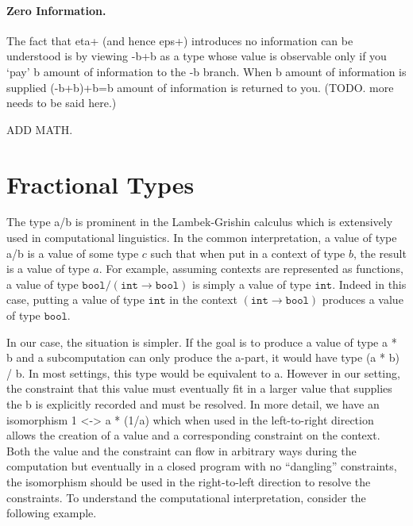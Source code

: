 \documentclass[preprint]{sigplanconf}
\begin{document}
\paragraph*{Zero Information.}
The fact that {{eta+}} (and hence {{eps+}}) introduces no information
can be understood is by viewing {{-b+b}} as a type whose value is
observable only if you `pay' {{b}} amount of information to the {{-b}}
branch. When {{b}} amount of information is supplied {{(-b+b)+b=b}}
amount of information is returned to you. (TODO. more needs to be said
here.)

ADD MATH. 

\section{Fractional Types}
\label{sec:frac}

The type {{a/b}} is prominent in the Lambek-Grishin calculus which is
extensively used in computational linguistics. In the common interpretation,
a value of type {{a/b}} is a value of some type $c$ such that when put in a
context of type $b$, the result is a value of type $a$. For example, assuming
contexts are represented as functions, a value of type $\texttt{bool} /
(\texttt{int} \rightarrow \texttt{bool})$ is simply a value of type
$\texttt{int}$. Indeed in this case, putting a value of type $\texttt{int}$
in the context $(\texttt{int} \rightarrow \texttt{bool})$ produces a value of
type $\texttt{bool}$. 

In our case, the situation is simpler. If the goal is to produce a value of
type {{a * b}} and a subcomputation can only produce the {{a}}-part, it would
have type {{(a * b) / b}}. In most settings, this type would be equivalent to
{{a}}. However in our setting, the constraint that this value must eventually
fit in a larger value that supplies the {{b}} is explicitly recorded and must
be resolved. In more detail, we have an isomorphism {{ 1 <-> a * (1/a) }}
which when used in the left-to-right direction allows the creation of a value
and a corresponding constraint on the context.  Both the value and the
constraint can flow in arbitrary ways during the computation but eventually
in a closed program with no ``dangling'' constraints, the isomorphism should
be used in the right-to-left direction to resolve the constraints.  To
understand the computational interpretation, consider the following example.
\end{document}
